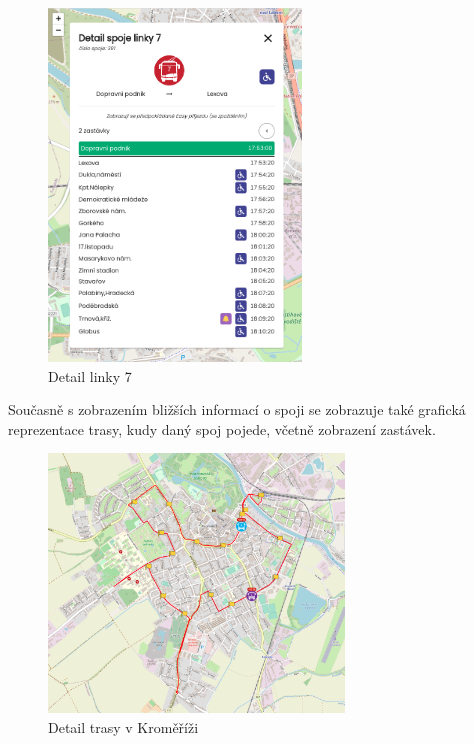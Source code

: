 \begin{figure}[H]
    \centering
    \includegraphics[width=0.6\textwidth]{images/global_pce_con_detail_7.png}
    \caption{Detail linky 7}
    \label{detail7}
\end{figure}

Současně s zobrazením bližších informací o spoji se zobrazuje také grafická reprezentace trasy, kudy daný spoj pojede, včetně zobrazení zastávek.

\begin{figure}[H]
    \centering
    \includegraphics[width=0.7\textwidth]{images/krom_line_6.png}
    \caption{Detail trasy v Kroměříži}
    \label{trasa}
\end{figure}

